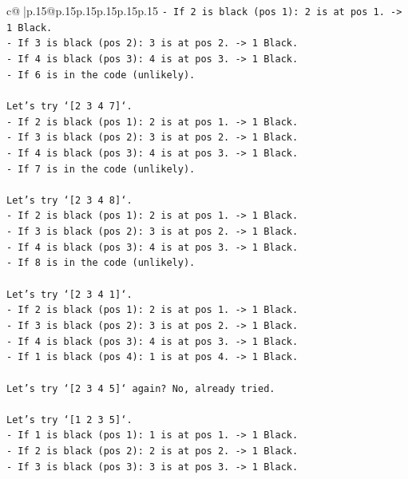 \documentclass{article}
\begin{document}
{\begin{supertabular}{c@{$\;$}|p{.15\linewidth}@{}p{.15\linewidth}p{.15\linewidth}p{.15\linewidth}p{.15\linewidth}p{.15\linewidth}}
{{{\texttt{{-} If 2 is black (pos 1): 2 is at pos 1. {-}> 1 Black.} \\
\texttt{{-} If 3 is black (pos 2): 3 is at pos 2. {-}> 1 Black.} \\
\texttt{{-} If 4 is black (pos 3): 4 is at pos 3. {-}> 1 Black.} \\
\texttt{{-} If 6 is in the code (unlikely).} \\
\\ 
\texttt{Let's try `{[}2 3 4 7{]}`.} \\
\texttt{{-} If 2 is black (pos 1): 2 is at pos 1. {-}> 1 Black.} \\
\texttt{{-} If 3 is black (pos 2): 3 is at pos 2. {-}> 1 Black.} \\
\texttt{{-} If 4 is black (pos 3): 4 is at pos 3. {-}> 1 Black.} \\
\texttt{{-} If 7 is in the code (unlikely).} \\
\\ 
\texttt{Let's try `{[}2 3 4 8{]}`.} \\
\texttt{{-} If 2 is black (pos 1): 2 is at pos 1. {-}> 1 Black.} \\
\texttt{{-} If 3 is black (pos 2): 3 is at pos 2. {-}> 1 Black.} \\
\texttt{{-} If 4 is black (pos 3): 4 is at pos 3. {-}> 1 Black.} \\
\texttt{{-} If 8 is in the code (unlikely).} \\
\\ 
\texttt{Let's try `{[}2 3 4 1{]}`.} \\
\texttt{{-} If 2 is black (pos 1): 2 is at pos 1. {-}> 1 Black.} \\
\texttt{{-} If 3 is black (pos 2): 3 is at pos 2. {-}> 1 Black.} \\
\texttt{{-} If 4 is black (pos 3): 4 is at pos 3. {-}> 1 Black.} \\
\texttt{{-} If 1 is black (pos 4): 1 is at pos 4. {-}> 1 Black.} \\
\\ 
\texttt{Let's try `{[}2 3 4 5{]}` again? No, already tried.} \\
\\ 
\texttt{Let's try `{[}1 2 3 5{]}`.} \\
\texttt{{-} If 1 is black (pos 1): 1 is at pos 1. {-}> 1 Black.} \\
\texttt{{-} If 2 is black (pos 2): 2 is at pos 2. {-}> 1 Black.} \\
\texttt{{-} If 3 is black (pos 3): 3 is at pos 3. {-}> 1 Black.} \\
}}}
\end{supertabular}}
\end{document}
